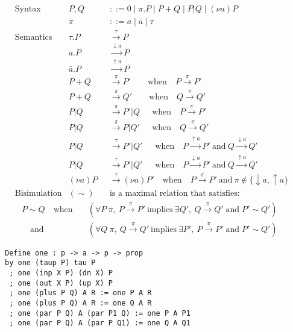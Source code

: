 \documentclass{llncs}
\begin{document}
\begin{figure}
\begin{align*}
&\text{Syntax} &
P,Q &::= 0 \mid \pi.P \mid P + Q \mid P|Q \mid (\nu a)P \\ &&
\pi &::= a \mid \bar{a} \mid \tau
\\
&\text{Semantics} &
\tau.P &\xrightarrow{\tau} P \\ &&
a.P &\xrightarrow{\downarrow a} P \\ &&
\bar{a}.P &\xrightarrow{\uparrow a} P \\ &&
P+Q &\xrightarrow{\pi} P' \qquad\text{when}\quad P \xrightarrow{\pi} P' \\ &&
P+Q &\xrightarrow{\pi} Q' \qquad\text{when}\quad Q \xrightarrow{\pi} Q' \\ &&
P|Q &\xrightarrow{\pi} P'|Q ~~\quad\text{when}\quad P \xrightarrow{\pi} P' \\ &&
P|Q &\xrightarrow{\pi} P|Q' ~~\quad\text{when}\quad Q \xrightarrow{\pi} Q' \\ &&
P|Q &\xrightarrow{\tau} P'|Q' ~\;\quad\text{when}\quad
  P \xrightarrow{\uparrow a} P' ~\text{and}~
  Q \xrightarrow{\downarrow a} Q' \\ &&
P|Q &\xrightarrow{\tau} P'|Q' ~\;\quad\text{when}\quad
  P \xrightarrow{\downarrow a} P' ~\text{and}~
  Q \xrightarrow{\uparrow a} Q' \\ &&
(\nu a)P &\xrightarrow{\tau} (\nu a)P' \quad\text{when}\quad
  P \xrightarrow{\pi} P' ~\text{and}~ \pi \notin \{\downarrow a, \uparrow a\}
  \\[2ex]
  &\text{Bisimulation} & (\sim)\quad &
  \text{is a maximal relation that satisfies:}
\end{align*}
\vspace{-6ex}
\begin{align*}
  &&P \sim Q \quad\text{when}\quad
&(\forall P ~ \pi,~ P\xrightarrow{\pi}P' ~\text{implies}~
        \exists Q',~ Q\xrightarrow{\pi}Q' \;\text{and}\; P'\sim Q') \\ &&
      \quad\text{and}~
&(\forall Q ~ \pi,~ Q\xrightarrow{\pi}Q' ~\text{implies}~
        \exists P',~ P\xrightarrow{\pi}P' \;\text{and}\; P'\sim Q')
\end{align*}
\vspace*{-3ex}
\begin{lstlisting}
Define one : p -> a -> p -> prop
by one (taup P) tau P
 ; one (inp X P) (dn X) P
 ; one (out X P) (up X) P
 ; one (plus P Q) A R := one P A R
 ; one (plus P Q) A R := one Q A R
 ; one (par P Q) A (par P1 Q) := one P A P1
 ; one (par P Q) A (par P Q1) := one Q A Q1

\end{lstlisting}
\end{figure}
\end{document}
